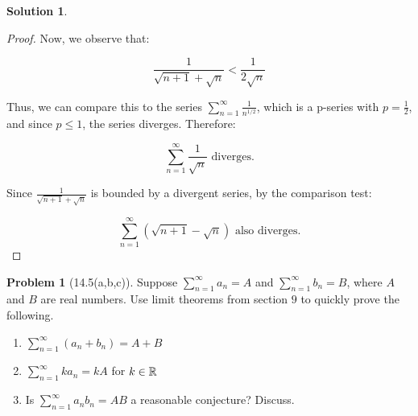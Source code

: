 \documentclass[12pt]{article}
\theoremstyle{definition} %
\newtheorem{solution}{Solution}
\newtheorem{problem}{Problem}
\theoremstyle{plain} %
\begin{document}
\begin{solution}
\begin{enumerate}
\begin{proof}
      Now, we observe that:
      
      \[
      \frac{1}{\sqrt{n+1} + \sqrt{n}} < \frac{1}{2\sqrt{n}}
      \]
      
      Thus, we can compare this to the series \( \sum_{n=1}^{\infty} \frac{1}{n^{1/2}} \), which is a p-series with \( p = \frac{1}{2} \), and since \( p \leq 1 \), the series diverges. Therefore:
      
      \[
      \sum_{n=1}^{\infty} \frac{1}{\sqrt{n}} \text{ diverges.}
      \]
      
      Since \( \frac{1}{\sqrt{n+1} + \sqrt{n}} \) is bounded by a divergent series, by the comparison test:
      
      \[
      \sum_{n=1}^{\infty} \left( \sqrt{n+1} - \sqrt{n} \right) \text{ also diverges.}
      \]
      \end{proof}
       
      \end{enumerate}
      \end{solution}
\begin{problem}[14.5(a,b,c)]
   Suppose \(\sum_{n=1}^{\infty} a_{n} =A\) and \(\sum_{n=1}^{\infty} b_{n} =B\), where \(A\) and \(B\) are real numbers. Use limit theorems from section \(9\) to quickly prove the following.
   \begin{enumerate}
    \item \(\sum_{n=1}^{\infty} (a_{n} +b_{n}  )=A+B\)
    \item \(\sum_{n=1}^{\infty} ka_{n} =kA\) for \(k\in \mathbb{\MakeUppercase{r}} \)   
    \item Is \(\sum_{n=1}^{\infty} a_{n}b_{n} =AB\) a reasonable conjecture? Discuss.  
   \end{enumerate}  
\end{problem}
\end{document}

